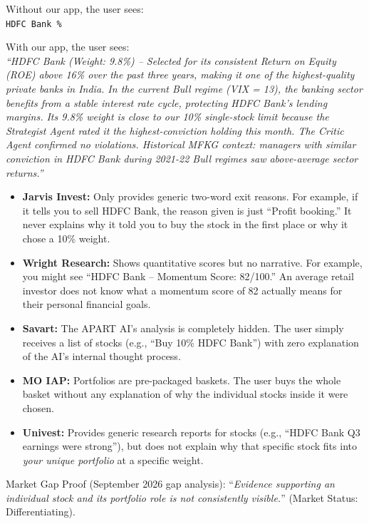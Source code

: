\documentclass[12pt, a4paper, openany, oneside]{report}
\begin{document}
\begin{examplebox}
Without our app, the user sees:\\
\texttt{HDFC Bank \%}

With our app, the user sees:\\
\textit{``HDFC Bank (Weight: 9.8\%) -- Selected for its consistent Return on Equity (ROE) above 16\% over the past three years, making it one of the highest-quality private banks in India. In the current Bull regime (VIX = 13), the banking sector benefits from a stable interest rate cycle, protecting HDFC Bank's lending margins. Its 9.8\% weight is close to our 10\% single-stock limit because the Strategist Agent rated it the highest-conviction holding this month. The Critic Agent confirmed no violations. Historical MFKG context: managers with similar conviction in HDFC Bank during 2021-22 Bull regimes saw above-average sector returns.''}
\end{examplebox}

\begin{gapbox}
\begin{itemize}[noitemsep]
  \item \textbf{Jarvis Invest:} Only provides generic two-word exit reasons. For example, if it tells you to sell HDFC Bank, the reason given is just ``Profit booking.'' It never explains why it told you to buy the stock in the first place or why it chose a 10\% weight.
  \item \textbf{Wright Research:} Shows quantitative scores but no narrative. For example, you might see ``HDFC Bank -- Momentum Score: 82/100.'' An average retail investor does not know what a momentum score of 82 actually means for their personal financial goals.
  \item \textbf{Savart:} The APART AI's analysis is completely hidden. The user simply receives a list of stocks (e.g., ``Buy 10\% HDFC Bank'') with zero explanation of the AI's internal thought process.
  \item \textbf{MO IAP:} Portfolios are pre-packaged baskets. The user buys the whole basket without any explanation of why the individual stocks inside it were chosen.
  \item \textbf{Univest:} Provides generic research reports for stocks (e.g., ``HDFC Bank Q3 earnings were strong''), but does not explain why that specific stock fits into \textit{your unique portfolio} at a specific weight.
\end{itemize}
Market Gap Proof (September 2026 gap analysis): ``\textit{Evidence supporting an individual stock and its portfolio role is not consistently visible.}'' (Market Status: Differentiating).
\end{gapbox}
\end{document}
